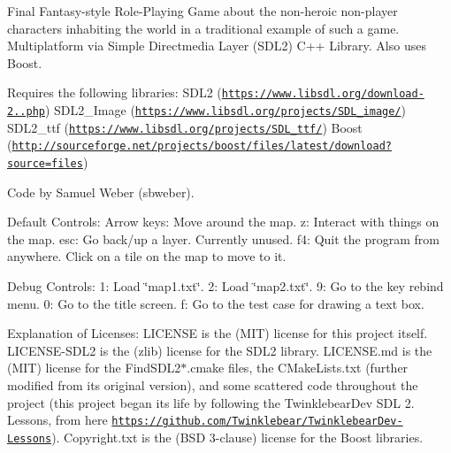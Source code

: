 Final Fantasy-\/style Role-\/\+Playing Game about the non-\/heroic non-\/player characters inhabiting the world in a traditional example of such a game. Multiplatform via Simple Directmedia Layer (S\+D\+L2) C++ Library. Also uses Boost.

Requires the following libraries\+: S\+D\+L2 (\href{https://www.libsdl.org/download-2.0.php}{\tt https\+://www.\+libsdl.\+org/download-\/2..\+php}) S\+D\+L2\+\_\+\+Image (\href{https://www.libsdl.org/projects/SDL_image/}{\tt https\+://www.\+libsdl.\+org/projects/\+S\+D\+L\+\_\+image/}) S\+D\+L2\+\_\+ttf (\href{https://www.libsdl.org/projects/SDL_ttf/}{\tt https\+://www.\+libsdl.\+org/projects/\+S\+D\+L\+\_\+ttf/}) Boost (\href{http://sourceforge.net/projects/boost/files/latest/download?source=files}{\tt http\+://sourceforge.\+net/projects/boost/files/latest/download?source=files})

Code by Samuel Weber (sbweber).

Default Controls\+: Arrow keys\+: Move around the map. z\+: Interact with things on the map. esc\+: Go back/up a layer. Currently unused. f4\+: Quit the program from anywhere. Click on a tile on the map to move to it.

Debug Controls\+: 1\+: Load \char`\"{}map1.\+txt\char`\"{}. 2\+: Load \char`\"{}map2.\+txt\char`\"{}. 9\+: Go to the key rebind menu. 0\+: Go to the title screen. f\+: Go to the test case for drawing a text box.

Explanation of Licenses\+: L\+I\+C\+E\+N\+SE is the (M\+IT) license for this project itself. L\+I\+C\+E\+N\+S\+E-\/\+S\+D\+L2 is the (zlib) license for the S\+D\+L2 library. L\+I\+C\+E\+N\+S\+E.\+md is the (M\+IT) license for the Find\+S\+D\+L2$\ast$.cmake files, the C\+Make\+Lists.\+txt (further modified from its original version), and some scattered code throughout the project (this project began its life by following the Twinklebear\+Dev S\+DL 2. Lessons, from here \href{https://github.com/Twinklebear/TwinklebearDev-Lessons}{\tt https\+://github.\+com/\+Twinklebear/\+Twinklebear\+Dev-\/\+Lessons}). Copyright.\+txt is the (B\+SD 3-\/clause) license for the Boost libraries. 